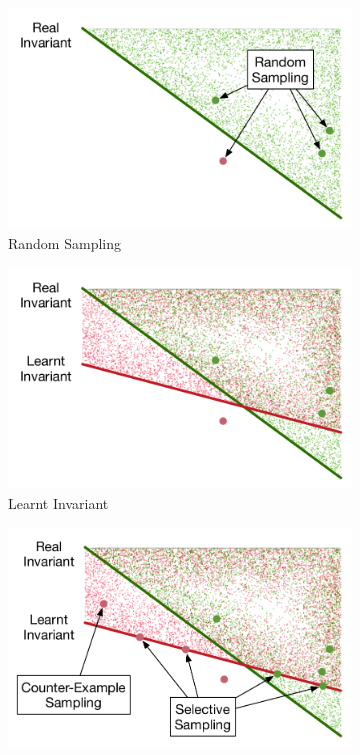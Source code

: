 \begin{figure}[!h]
    \centering
    \begin{subfigure}{0.23\textwidth}
        \centering
        \includegraphics[scale=0.3]{figures/general-sampling-0.pdf}
        \caption{Random Sampling}
        \label{fig:sampling:random}
    \end{subfigure}
    \begin{subfigure}{0.23\textwidth}
        \centering
        \includegraphics[scale=0.3]{figures/general-sampling-1.pdf}
        \caption{Learnt Invariant}
        \label{fig:sampling:random:invariant}
    \end{subfigure}
    \begin{subfigure}{0.23\textwidth}
        \centering
        \includegraphics[scale=0.3]{figures/general-sampling-2.pdf}

\end{subfigure}
\end{figure}
